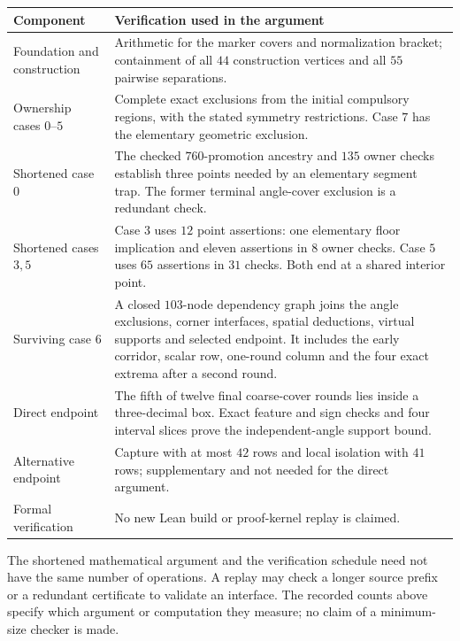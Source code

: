 \documentclass[11pt]{article}
\begin{document}
\begin{center}\small
\begin{tabular}{@{}p{}p{}@{}}
\toprule
Component & Verification used in the argument\\\midrule
Foundation and construction & Arithmetic for the marker covers and
normalization bracket; containment of all $44$ construction vertices and
all $55$ pairwise separations.\\
Ownership cases $0$--$5$ & Complete exact exclusions from the initial
compulsory regions, with the stated symmetry restrictions. Case $7$ has
the elementary geometric exclusion.\\
Shortened case $0$ & The checked $760$-promotion ancestry and $135$ owner
checks establish three points needed by an elementary segment trap.
The former terminal angle-cover exclusion is a redundant check.\\
Shortened cases $3,5$ & Case $3$ uses $12$ point assertions: one elementary
floor implication and eleven assertions in $8$ owner checks. Case $5$
uses $65$ assertions in $31$ checks. Both end at a shared interior point.\\
Surviving case $6$ & A closed $103$-node dependency graph joins the angle
exclusions, corner interfaces, spatial deductions, virtual supports and
selected endpoint. It includes the early corridor, scalar row, one-round
column and the four exact extrema after a second round.\\
Direct endpoint & The fifth of twelve final coarse-cover rounds lies
inside a three-decimal box. Exact feature and sign checks and four
interval slices prove the independent-angle support bound.\\
Alternative endpoint & Capture with at most $42$ rows and local isolation
with $41$ rows; supplementary and not needed for the direct argument.\\
Formal verification & No new Lean build or proof-kernel replay is claimed.\\
\bottomrule
\end{tabular}
\end{center}

The shortened mathematical argument and the verification schedule need
not have the same number of operations. A replay may check a longer
source prefix or a redundant certificate to validate an interface.
The recorded counts above specify which argument or computation they
measure; no claim of a minimum-size checker is made.
\end{document}
